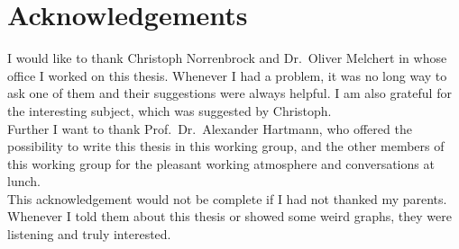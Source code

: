 \section*{Acknowledgements}
    I would like to thank Christoph Norrenbrock and Dr.\ Oliver Melchert
    in whose office I worked on this thesis. Whenever I had a problem,
    it was no long way to ask one of them and their suggestions were
    always helpful. I am also grateful for the interesting subject, which
    was suggested by Christoph.\\
    Further I want to thank Prof.\ Dr.\ Alexander Hartmann, who offered the
    possibility to write this thesis in this working group,
    and the other members of this working group for the pleasant working
    atmosphere and conversations at lunch.\\
    This acknowledgement would not be complete if I had not thanked my
    parents. Whenever I told them about this thesis or showed some weird
    graphs, they were listening and truly interested.

